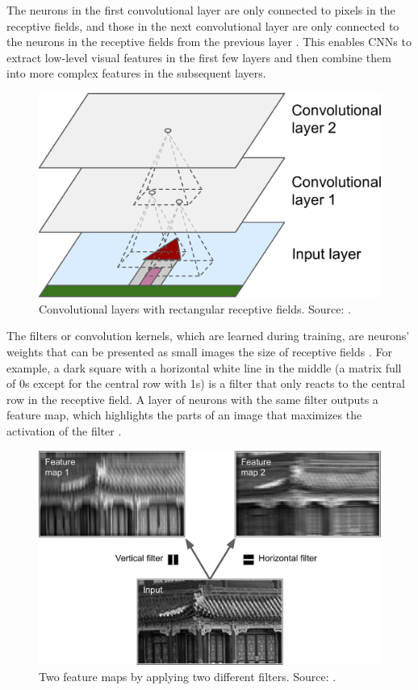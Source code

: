 \documentclass[a4paper, 11pt, oneside]{article}
\begin{document}
The neurons in the first convolutional layer are only connected to pixels in the receptive fields, and those in
the next convolutional layer are only connected to the neurons in the receptive fields from the previous layer
\cite{geron2019hands}. This enables CNNs to extract low-level visual features in the first few layers and then combine
them into more complex features in the subsequent layers.

\begin{figure}[ht]
  \begin{center}
    \includegraphics[width=.5\textwidth]{cnn_layers.png}
  \end{center}
  \caption{Convolutional layers with rectangular receptive fields. Source: \cite{geron2019hands}.}
\end{figure}

The filters or convolution kernels, which are learned during training, are neurons' weights that can be presented as
small images the size of receptive fields \cite{geron2019hands}. For example, a dark square with a horizontal white
line in the middle (a matrix full of 0s except for the central row with 1s) is a filter that only reacts to the central
row in the receptive field. A layer of neurons with the same filter outputs a feature map, which highlights the parts
of an image that maximizes the activation of the filter \cite{geron2019hands}.

\begin{figure}[ht]
  \begin{center}
    \includegraphics[width=.6\textwidth]{filters.png}
  \end{center}
  \caption{Two feature maps by applying two different filters. Source: \cite{geron2019hands}.}
\end{figure}
\end{document}
